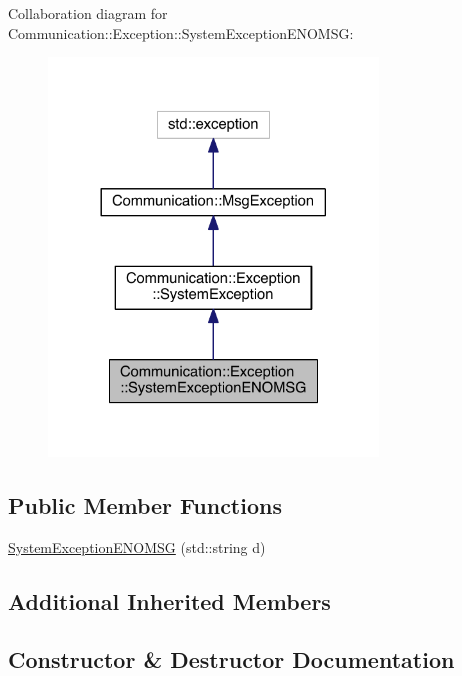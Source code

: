 Collaboration diagram for Communication\+:\+:Exception\+:\+:System\+Exception\+E\+N\+O\+M\+S\+G\+:\nopagebreak
\begin{figure}[H]
\begin{center}
\leavevmode
\includegraphics[width=248pt]{class_communication_1_1_exception_1_1_system_exception_e_n_o_m_s_g__coll__graph}
\end{center}
\end{figure}
\subsection*{Public Member Functions}
\begin{DoxyCompactItemize}
\item 
\hyperlink{class_communication_1_1_exception_1_1_system_exception_e_n_o_m_s_g_a8039cb421aed7ad1e838ff40f6cc570d}{System\+Exception\+E\+N\+O\+M\+S\+G} (std\+::string d)
\end{DoxyCompactItemize}
\subsection*{Additional Inherited Members}


\subsection{Constructor \& Destructor Documentation}
\hypertarget{class_communication_1_1_exception_1_1_system_exception_e_n_o_m_s_g_a8039cb421aed7ad1e838ff40f6cc570d}{}
